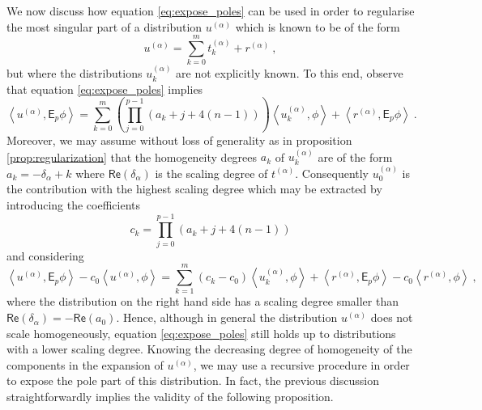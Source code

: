 \documentclass[12pt]{book}
\renewcommand{\Re}{\mathsf{Re}}
\newcommand{\sm}[1]{\left\langle#1\right\rangle}
\newcommand{\Esf}{\mathsf{E}}
\theoremstyle{break}
\begin{document}
We now discuss how equation \eqref{eq:expose_poles} can be used in order to regularise the most singular part of a distribution $u^{(\alpha)}$ which is known to be of the form
%
\begin{equation*}
u^{(\alpha)} = \sum_{k=0}^m t^{(\alpha)}_k + r^{(\alpha)} \ ,
\end{equation*}
%
but where the distributions $u^{(\alpha)}_k$ are not explicitly known. To this end, observe that equation \eqref{eq:expose_poles} implies
%
\begin{equation*}
\sm{ u^{(\alpha)} , \Esf_p \phi } = \sum_{k=0}^m \left( \prod_{j=0}^{p-1} (a_k+j+4(n-1)) \right) \sm{ u^{(\alpha)}_k , \phi } + \sm{ r^{(\alpha)} , \Esf_p \phi } \ .
\end{equation*}
%
Moreover, we may assume without loss of generality as in proposition \ref{prop:regularization} that the homogeneity degrees $a_k$ of $u^{(\alpha)}_k$ are of the form $a_k = -\delta_\alpha + k$ where $\Re(\delta_\alpha)$ is the scaling degree of $t^{(\alpha)}$. Consequently $u^{(\alpha)}_0$ is the contribution with the highest scaling degree which may be extracted by introducing the coefficients
%
\begin{equation*}
c_k = \prod_{j=0}^{p-1} \left(a_k+j+4(n-1)\right) 
\end{equation*}
%
and considering
%
\begin{equation}
\sm{ u^{(\alpha)} , \Esf_p \phi } - c_0 \sm{ u^{(\alpha)} , \phi } = \sum_{k=1}^m (c_k-c_0) \sm{ u^{(\alpha)}_k , \phi } + \sm{ r^{(\alpha)} , \Esf_p \phi } - c_0 \sm{ r^{(\alpha)}, \phi } \ ,
\label{eq:decrease_scaling_degree}
\end{equation}
%
where the distribution on the right hand side has a scaling degree smaller than $\Re(\delta_\alpha) = - \Re (a_0)$. Hence, although in general the distribution $u^{(\alpha)}$ does not scale homogeneously, equation \eqref{eq:expose_poles} still holds up to distributions with a lower scaling degree. Knowing the decreasing degree of homogeneity of the components in the expansion of $u^{(\alpha)}$, we may use a recursive procedure in order to expose the pole part of this distribution. In fact, the previous discussion straightforwardly implies the validity of the following proposition.
\end{document}
